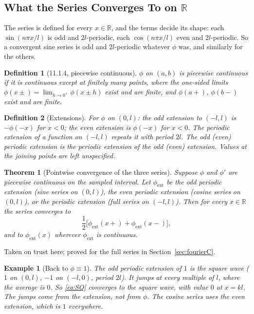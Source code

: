 \documentclass{article}
\newtheorem{theorem}{Theorem}
\newtheorem{definition}{Definition}
\newtheorem*{example}{Example}
\newcommand{\R}{\mathbb{R}}
\begin{document}
\subsection{What the Series Converges To on $\R$}
The series is defined for every $x \in \R$, and the terms decide its shape: each $\sin(n\pi x/l)$ is odd and $2l$-periodic, each $\cos(n\pi x/l)$ even and $2l$-periodic. So a convergent sine series is odd and $2l$-periodic whatever $\phi$ was, and similarly for the others.
\begin{definition}[11.1.4, piecewise continuous]
    $\phi$ on $(a,b)$ is piecewise continuous if it is continuous except at finitely many points, where the one-sided limits $\phi(x\pm) = \lim_{h\to0^+}\phi(x\pm h)$ exist and are finite, and $\phi(a+)$, $\phi(b-)$ exist and are finite.
\end{definition}
\begin{definition}[Extensions]
    For $\phi$ on $(0,l)$: the \emph{odd extension} to $(-l,l)$ is $-\phi(-x)$ for $x < 0$; the \emph{even extension} is $\phi(-x)$ for $x < 0$. The \emph{periodic extension} of a function on $(-l,l)$ repeats it with period $2l$. The odd (even) periodic extension is the periodic extension of the odd (even) extension. Values at the joining points are left unspecified.
\end{definition}
\begin{theorem}[Pointwise convergence of the three series]
    Suppose $\phi$ and $\phi'$ are piecewise continuous on the sampled interval. Let $\phi_{\text{ext}}$ be the odd periodic extension (sine series on $(0,l)$), the even periodic extension (cosine series on $(0,l)$), or the periodic extension (full series on $(-l,l)$). Then for every $x \in \R$ the series converges to
    \begin{equation}
        \frac12\big[\phi_{\text{ext}}(x+) + \phi_{\text{ext}}(x-)\big],
    \end{equation}
    and to $\phi_{\text{ext}}(x)$ wherever $\phi_{\text{ext}}$ is continuous.
\end{theorem}
Taken on trust here; proved for the full series in Section~\ref{sec:fourierC}.
\begin{example}[Back to $\phi \equiv 1$]
    The odd periodic extension of $1$ is the square wave ($1$ on $(0,l)$, $-1$ on $(-l,0)$, period $2l$). It jumps at every multiple of $l$, where the average is $0$. So \eqref{eq:SQ} converges to the square wave, with value $0$ at $x = kl$. The jumps come from the extension, not from $\phi$. The cosine series uses the even extension, which is $1$ everywhere.
\end{example}
\end{document}
